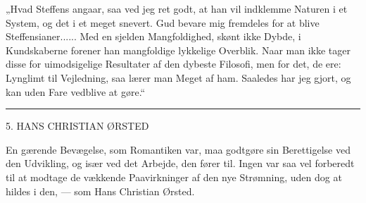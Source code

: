 \documentclass[12pt,a4paper,openany]{book}
\newcommand{\opage}[1]{\marginnote{\footnotesize\textit{[#1]}}}
\begin{document}
„Hvad Steffens angaar, saa ved jeg ret godt, at han vil indklemme Naturen i et
System, og det i et meget snevert. Gud bevare mig fremdeles for at blive
Steffensianer...... Med en sjelden Mangfoldighed, skønt ikke Dybde, i
Kundskaberne forener han mangfoldige lykkelige Overblik. Naar man ikke tager
disse for uimodsigelige Resultater af den dybeste Filosofi, men for det, de
ere: Lynglimt til Vejledning, saa lærer man Meget af ham. Saaledes har jeg
gjort, og kan uden Fare vedblive at gøre.“

\begin{center}\rule{2cm}{0.4pt}\end{center}

\setcounter{footnote}{0}%
\opage{49}

\begin{center}\large 5. HANS CHRISTIAN ØRSTED\end{center}

En gærende Bevægelse, som Romantiken var, maa godtgøre sin Berettigelse ved den
Udvikling, og især ved det Arbejde, den fører til. Ingen var saa vel forberedt
til at modtage de vækkende Paavirkninger af den nye Strømning, uden dog at
hildes i den, --- som Hans Christian Ørsted.
\end{document}
